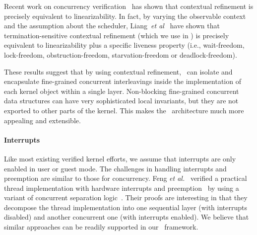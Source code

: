 Recent work on concurrency verification~\cite{liang13,filipovic10} has
shown that contextual refinement is precisely equivalent to
linearizability. In fact, by
varying the observable context and the assumption about the scheduler,
Liang~{\em{}et al}~\cite{liang13} have shown that termination-sensitive
contextual refinement (which we use in \CTOS) is precisely equivalent
to linearizability plus a specific liveness property (i.e., 
wait-freedom, lock-freedom, obstruction-freedom, starvation-freedom
or deadlock-freedom).

These results suggest that by using contextual
refinement, \CTOS\ can isolate and encapsulate fine-grained concurrent
interleavings inside the implementation of each kernel object within a
single layer. Non-blocking fine-grained concurrent data structures can have
very sophisticated local invariants, but they are not exported to
other parts of the kernel. This makes the \CTOS\ architecture much
more appealing and extensible.

\paragraph{Interrupts} Like most existing verified kernel efforts,
we assume that interrupts are only enabled in user or guest mode. The
challenges in handling interrupts and preemption are similar to those
for concurrency. Feng {\em et al.}~\cite{feng08:vstte} verified a
practical thread implementation with hardware interrupts and
preemption~\cite{feng08:aim} by using a variant of concurrent
separation logic~\cite{ohearn:concur04}. Their proofs are interesting
in that they decompose the thread implementation into one sequential
layer (with interrupts disabled) and another concurrent one
(with interrupts enabled). We believe that similar approaches can
be readily supported in our \CTOS\ framework.

